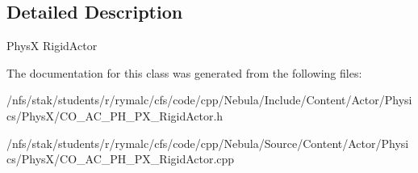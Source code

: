 \subsection{Detailed Description}
PhysX RigidActor 

The documentation for this class was generated from the following files:\begin{DoxyCompactItemize}
\item 
/nfs/stak/students/r/rymalc/cfs/code/cpp/Nebula/Include/Content/Actor/Physics/PhysX/CO\_\-AC\_\-PH\_\-PX\_\-RigidActor.h\item 
/nfs/stak/students/r/rymalc/cfs/code/cpp/Nebula/Source/Content/Actor/Physics/PhysX/CO\_\-AC\_\-PH\_\-PX\_\-RigidActor.cpp\end{DoxyCompactItemize}
